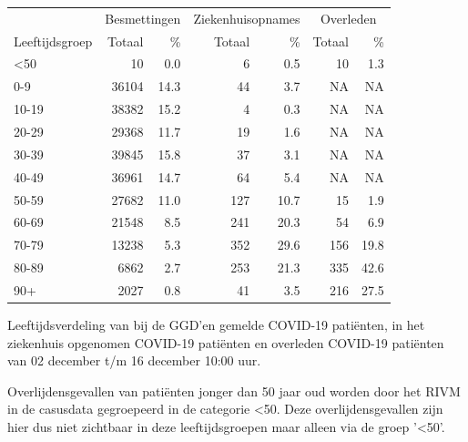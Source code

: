 \documentclass[
  english,
  man,floatsintext]{apa6}
\begin{document}
\begin{table}
\centering\begingroup\fontsize{11}{13}\selectfont

\begin{threeparttable}
\begin{tabular}{lrrrrrr}
\toprule
\multicolumn{1}{c}{ } & \multicolumn{2}{c}{Besmettingen} & \multicolumn{2}{c}{Ziekenhuisopnames} & \multicolumn{2}{c}{Overleden} \\
\cmidrule(l{3pt}r{3pt}){2-3} \cmidrule(l{3pt}r{3pt}){4-5} \cmidrule(l{3pt}r{3pt}){6-7}
Leeftijdsgroep & Totaal & \% & Totaal & \% & Totaal & \%\\
\midrule
<50 & 10 & 0.0 & 6 & 0.5 & 10 & 1.3\\
0-9 & 36104 & 14.3 & 44 & 3.7 & NA & NA\\
10-19 & 38382 & 15.2 & 4 & 0.3 & NA & NA\\
20-29 & 29368 & 11.7 & 19 & 1.6 & NA & NA\\
30-39 & 39845 & 15.8 & 37 & 3.1 & NA & NA\\
40-49 & 36961 & 14.7 & 64 & 5.4 & NA & NA\\
50-59 & 27682 & 11.0 & 127 & 10.7 & 15 & 1.9\\
60-69 & 21548 & 8.5 & 241 & 20.3 & 54 & 6.9\\
70-79 & 13238 & 5.3 & 352 & 29.6 & 156 & 19.8\\
80-89 & 6862 & 2.7 & 253 & 21.3 & 335 & 42.6\\
90+ & 2027 & 0.8 & 41 & 3.5 & 216 & 27.5\\
\bottomrule
\end{tabular}
\begin{tablenotes}
\item[1] Leeftijdsverdeling van bij de GGD’en gemelde COVID-19 patiënten, in het ziekenhuis opgenomen COVID-19 patiënten en overleden COVID-19 patiënten van 02 december t/m 16 december 10:00 uur.
\item[2] Overlijdensgevallen van patiënten jonger dan 50 jaar oud worden door het RIVM in de casusdata gegroepeerd in de categorie <50. Deze overlijdensgevallen zijn hier dus niet zichtbaar in deze leeftijdsgroepen maar alleen via de groep '<50'.
\end{tablenotes}
\end{threeparttable}
\endgroup{}
\end{table}

\newpage
\end{document}
